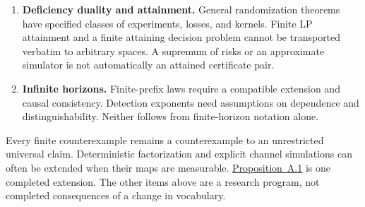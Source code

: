 \begin{enumerate}
\item
  \textbf{Deficiency duality and attainment.} General randomization theorems have specified classes of experiments, losses, and kernels. Finite LP attainment and a finite attaining decision problem cannot be transported verbatim to arbitrary spaces. A supremum of risks or an approximate simulator is not automatically an attained certificate pair.
\item
  \textbf{Infinite horizons.} Finite-prefix laws require a compatible extension and causal consistency. Detection exponents need assumptions on dependence and distinguishability. Neither follows from finite-horizon notation alone.
\end{enumerate}


Every finite counterexample remains a counterexample to an unrestricted universal claim. Deterministic factorization and explicit channel simulations can often be extended when their maps are measurable. \hyperlink{stmt:A.1}{Proposition~A.1} is one completed extension. The other items above are a research program, not completed consequences of a change in vocabulary.
